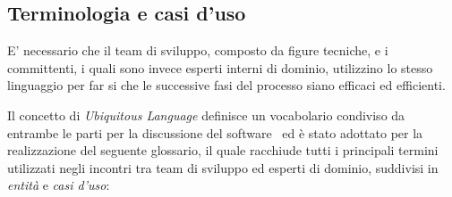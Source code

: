 \subsection{Terminologia e casi d'uso}
E' necessario che il team di sviluppo, composto da figure tecniche, e i committenti, i quali sono invece esperti interni di dominio, utilizzino lo stesso linguaggio per far si che le successive fasi del processo siano efficaci ed efficienti. 

Il concetto di \textit{Ubiquitous Language} definisce un vocabolario condiviso da entrambe le parti per la discussione del software~\cite{evans_domain-driven_2004} ed è stato adottato per la realizzazione del seguente glossario, il quale racchiude tutti i principali termini utilizzati negli incontri tra team di sviluppo ed esperti di dominio, suddivisi in \textit{entità} e \textit{casi d'uso}:

